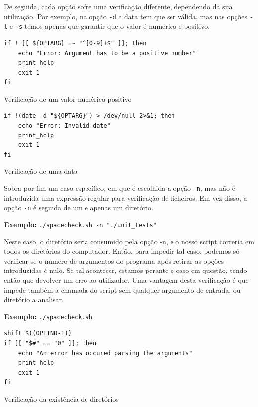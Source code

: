 De seguida, cada opção sofre uma verificação diferente,
dependendo da sua utilização. Por exemplo, na opção \verb|-d| a
data tem que ser válida, mas nas opções \verb|-l| e \verb|-s|
temos apenas que garantir que o valor é numérico e positivo.
\begin{listing}[H]
\begin{verbatim}
if ! [[ ${OPTARG} =~ "^[0-9]+$" ]]; then
    echo "Error: Argument has to be a positive number"
    print_help
    exit 1
fi
\end{verbatim}
\caption{Verificação de um valor numérico positivo}
\end{listing}

\begin{listing}[H]
\begin{verbatim}
if !(date -d "${OPTARG}") > /dev/null 2>&1; then
    echo "Error: Invalid date"
    print_help
    exit 1
fi
\end{verbatim}
\caption{Verificação de uma data}
\end{listing}

Sobra por fim um caso específico, em que é escolhida a opção
\verb|-n|, mas não é introduzida uma expressão regular para
verificação de ficheiros. Em vez disso, a opção \verb|-n| é
seguida de um e apenas um diretório.
\begin{listing}[H]
    \centering
    \textbf{Exemplo:} \verb|./spacecheck.sh -n "./unit_tests"|
\end{listing}
Neste caso, o diretório seria consumido pela opção -n, e o
nosso script correria em todos os diretórios do computador. 
Então, para impedir tal caso, podemos só verificar se o numero
de argumentos do programa após retirar as opções introduzidas é
nulo. Se tal acontecer, estamos perante o caso em questão,
tendo então que devolver um erro ao utilizador. 
Uma vantagem desta verificação é que impede também a chamada do
script sem qualquer argumento de entrada, ou diretório a analisar.
\begin{listing}[H]
    \centering
    \textbf{Exemplo:} \verb|./spacecheck.sh|
\end{listing}
\begin{listing}[H]
\begin{verbatim}
shift $((OPTIND-1))
if [[ "$#" == "0" ]]; then
    echo "An error has occured parsing the arguments"
    print_help
    exit 1
fi
\end{verbatim}
\caption{Verificação da existência de diretórios}
\end{listing}

